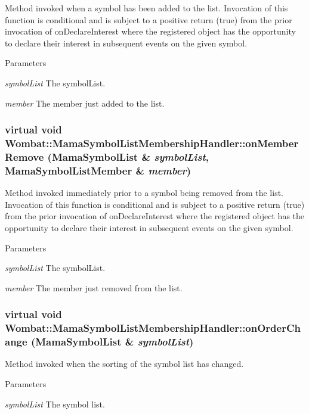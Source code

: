 Method invoked when a symbol has been added to the list. Invocation of this function is conditional and is subject to a positive return (true) from the prior invocation of {\ttfamily onDeclareInterest} where the registered object has the opportunity to declare their interest in subsequent events on the given symbol.


\begin{DoxyParams}{Parameters}
\item[{\em symbolList}]The symbolList. \item[{\em member}]The member just added to the list. \end{DoxyParams}
\hypertarget{classWombat_1_1MamaSymbolListMembershipHandler_ade0d0346baa0d18f9bb1d90edf96f243}{
\subsubsection[{onMemberRemove}]{\setlength{\rightskip}{0pt plus 5cm}virtual void Wombat::MamaSymbolListMembershipHandler::onMemberRemove ({\bf MamaSymbolList} \& {\em symbolList}, \/  {\bf MamaSymbolListMember} \& {\em member})}}
\label{classWombat_1_1MamaSymbolListMembershipHandler_ade0d0346baa0d18f9bb1d90edf96f243}


Method invoked immediately prior to a symbol being removed from the list. Invocation of this function is conditional and is subject to a positive return (true) from the prior invocation of {\ttfamily onDeclareInterest} where the registered object has the opportunity to declare their interest in subsequent events on the given symbol.


\begin{DoxyParams}{Parameters}
\item[{\em symbolList}]The symbolList. \item[{\em member}]The member just removed from the list. \end{DoxyParams}
\hypertarget{classWombat_1_1MamaSymbolListMembershipHandler_acfa51cc58e5a5aa428db3c124383e860}{
\subsubsection[{onOrderChange}]{\setlength{\rightskip}{0pt plus 5cm}virtual void Wombat::MamaSymbolListMembershipHandler::onOrderChange ({\bf MamaSymbolList} \& {\em symbolList})}}
\label{classWombat_1_1MamaSymbolListMembershipHandler_acfa51cc58e5a5aa428db3c124383e860}


Method invoked when the sorting of the symbol list has changed. 
\begin{DoxyParams}{Parameters}
\item[{\em symbolList}]The symbol list. \end{DoxyParams}
